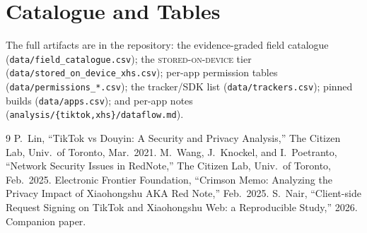 \documentclass[conference,10pt]{IEEEtran}
\newcommand{\code}[1]{\texttt{\small #1}}
\newcommand{\stored}{\textsc{stored-on-device}}
\begin{document}
\appendices
\section{Catalogue and Tables}
The full artifacts are in the repository: the evidence-graded field catalogue (\code{data/field\_catalogue.csv}); the \stored{} tier (\code{data/stored\_on\_device\_xhs.csv}); per-app permission tables (\code{data/permissions\_*.csv}); the tracker/SDK list (\code{data/trackers.csv}); pinned builds (\code{data/apps.csv}); and per-app notes (\code{analysis/\{tiktok,xhs\}/dataflow.md}).

\begin{thebibliography}{9}
 P.~Lin, ``TikTok vs Douyin: A Security and Privacy Analysis,'' The Citizen Lab, Univ.\ of Toronto, Mar.\ 2021.
 M.~Wang, J.~Knockel, and I.~Poetranto, ``Network Security Issues in RedNote,'' The Citizen Lab, Univ.\ of Toronto, Feb.\ 2025.
 Electronic Frontier Foundation, ``Crimson Memo: Analyzing the Privacy Impact of Xiaohongshu AKA Red Note,'' Feb.\ 2025.
 S.~Nair, ``Client-side Request Signing on TikTok and Xiaohongshu Web: a Reproducible Study,'' 2026. Companion paper.
\end{thebibliography}
\end{document}
